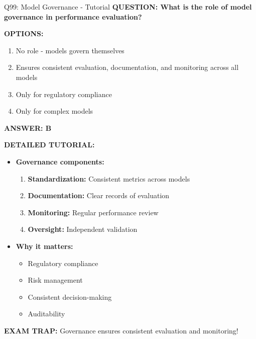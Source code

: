 \documentclass[8pt]{beamer}
\begin{document}
\begin{frame}{Q99: Model Governance - Tutorial}
	\fontsize{6.5}{7.5}\selectfont
	\textbf{QUESTION: What is the role of model governance in performance evaluation?}
	
	\vspace{0.1cm}
	\textbf{OPTIONS:}
	\begin{enumerate}
		\item No role - models govern themselves
		\item Ensures consistent evaluation, documentation, and monitoring across all models
		\item Only for regulatory compliance
		\item Only for complex models
	\end{enumerate}
	
	\vspace{0.1cm}
	\textcolor{myblue}{\textbf{ANSWER: B}}
	
	\vspace{0.1cm}
	\textbf{DETAILED TUTORIAL:}
	\begin{itemize}
		\item \textbf{Governance components:}
		\begin{enumerate}
			\item \textbf{Standardization:} Consistent metrics across models
			\item \textbf{Documentation:} Clear records of evaluation
			\item \textbf{Monitoring:} Regular performance review
			\item \textbf{Oversight:} Independent validation
		\end{enumerate}
		\item \textbf{Why it matters:}
		\begin{itemize}
			\item Regulatory compliance
			\item Risk management
			\item Consistent decision-making
			\item Auditability
		\end{itemize}
	\end{itemize}
	
	\textcolor{myred}{\textbf{EXAM TRAP:}} Governance ensures \textcolor{myblue}{consistent evaluation and monitoring}!
\end{frame}
\end{document}
